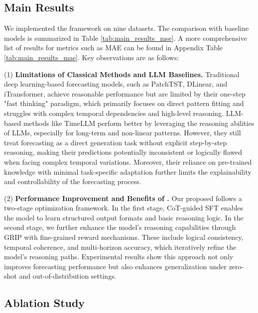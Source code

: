 
\subsection{Main Results}




We implemented the \Ours framework on nine datasets. The comparison with baseline models is summarized in Table \ref{tab:main_results_mse}. A more comprehensive list of results for metrics such as MAE can be found in Appendix Table \ref{tab:main_results_mae}. Key observations are as follows:

(1) \textbf{Limitations of Classical Methods and LLM Baselines.} Traditional deep learning-based forecasting models, such as PatchTST, DLinear, and iTransformer, achieve reasonable performance but are limited by their one-step "fast thinking" paradigm, which primarily focuses on direct pattern fitting and struggles with complex temporal dependencies and high-level reasoning. LLM-based methods like TimeLLM perform better by leveraging the reasoning abilities of LLMs, especially for long-term and non-linear patterns. However, they still treat forecasting as a direct generation task without explicit step-by-step reasoning, making their predictions potentially inconsistent or logically flawed when facing complex temporal variations. Moreover, their reliance on pre-trained knowledge with minimal task-specific adaptation further limits the explainability and controllability of the forecasting process.

\vspace{0.02in}
(2) \textbf{Performance Improvement and Benefits of \Ours.} Our proposed \Ours follows a two-stage optimization framework. In the first stage, CoT-guided SFT enables the model to learn structured output formats and basic reasoning logic. In the second stage, we further enhance the model’s reasoning capabilities through GRIP with fine-grained reward mechanisms. These include logical consistency, temporal coherence, and multi-horizon accuracy, which iteratively refine the model's reasoning paths. Experimental results show this approach not only improves forecasting performance but also enhances generalization under zero-shot and out-of-distribution settings.



\vspace{-0.02in}
\subsection{Ablation Study}

